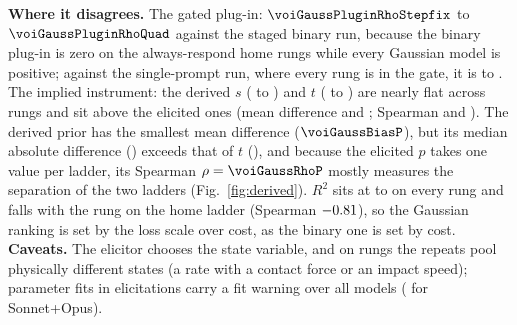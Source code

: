 \documentclass{article}
\begin{document}
\textbf{Where it disagrees.} The gated plug-in: $\voiGaussPluginRhoStepfix$ to $\voiGaussPluginRhoQuad$ against the staged binary run, because the binary plug-in is zero on the \twHomeAlwaysN{} always-respond home rungs while every Gaussian model is positive; against the single-prompt run, where every rung is in the gate, it is \voicmpsingleGaussPluginRhoKg{} to \voicmpsingleGaussPluginRhoQuad. The implied instrument: the derived $s$ (\twGaussSDerLo{} to \twGaussSDerHi) and $t$ (\twGaussTDerLo{} to \twGaussTDerHi) are nearly flat across rungs and sit above the elicited ones (mean difference \voiGaussBiasS{} and \voiGaussBiasT; Spearman \voiGaussRhoS{} and \voiGaussRhoT). The derived prior has the smallest mean difference ($\voiGaussBiasP$), but its median absolute difference (\voiGaussMadP) exceeds that of $t$ (\voiGaussMadT), and because the elicited $p$ takes one value per ladder, its Spearman $\rho=\voiGaussRhoP$ mostly measures the separation of the two ladders (Fig.~\ref{fig:derived}). $R^2$ sits at \twGaussRtwoLo{} to \twGaussRtwoHi{} on every rung and falls with the rung on the home ladder (Spearman $-0.81$), so the Gaussian ranking is set by the loss scale over cost, as the binary one is set by cost. \textbf{Caveats.} The elicitor chooses the state variable, and on \twGaussUnitRungs{} rungs the repeats pool physically different states (a rate with a contact force or an impact speed); \twGaussFitFlags{} parameter fits in \twGaussFitElic{} elicitations carry a fit warning over all models (\voigaussFitWarnings{} for Sonnet+Opus).
\end{document}
